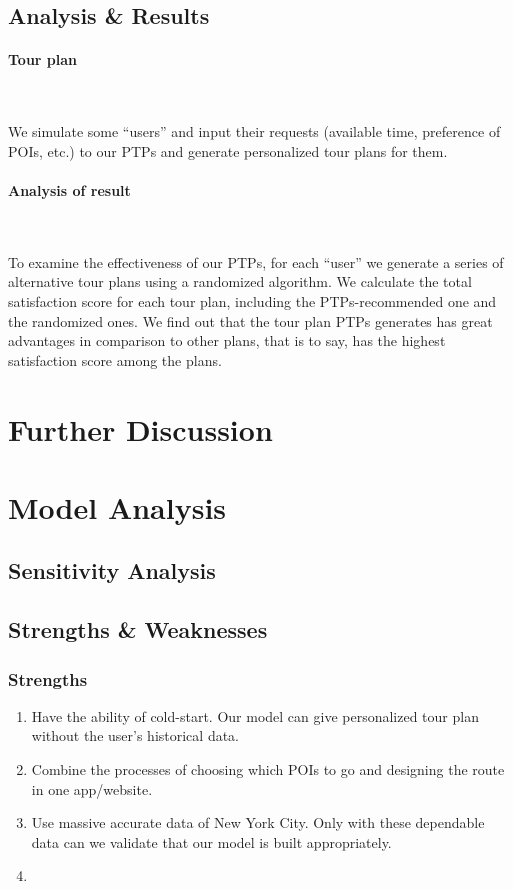 \documentclass{mcmthesis}
\begin{document}
\subsection{Analysis \& Results}
  \paragraph{Tour plan} \
  
  We simulate some ``users'' and input their requests (available time, preference of POIs, etc.) to our PTPs and generate personalized tour plans for them. 
  \paragraph{Analysis of result} \
  
  To examine the effectiveness of our PTPs, for each ``user'' we generate a series of alternative tour plans using a randomized algorithm. We calculate the total satisfaction score for each tour plan, including the PTPs-recommended one and the randomized ones. We find out that the tour plan PTPs generates has great advantages in comparison to other plans, that is to say, has the highest satisfaction score among the plans.


\section{Further Discussion}   %



\section{Model Analysis}
\subsection{Sensitivity Analysis}

\subsection{Strengths \& Weaknesses}
\subsubsection{Strengths}
  \begin{enumerate}
    \item Have the ability of cold-start. Our model can give personalized tour plan without the user's historical data.
    \item Combine the processes of choosing which POIs to go and designing the route in one app/website.
    \item Use massive accurate data of New York City. Only with these dependable data can we validate that our model is built appropriately.
    \item 
  \end{enumerate}
\end{document}
